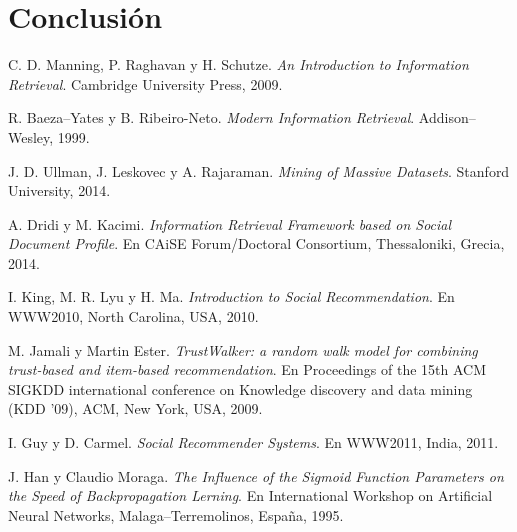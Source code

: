\documentclass[11pt, spanish]{report}
\begin{document}
	\chapter{Conclusión}
		
	
		
	\begin{thebibliography}{56}
		
  			C. D. Manning, P. Raghavan y H. Schutze.
  			\textit{An Introduction to Information Retrieval}.
  			Cambridge University Press, 
  			2009.
  		
  			R. Baeza--Yates y B. Ribeiro-Neto.
  			\textit{Modern Information Retrieval}.
  			Addison--Wesley, 
  			1999.
  		
  			J. D. Ullman, J. Leskovec y A. Rajaraman.
  			\textit{Mining of Massive Datasets}.
  			Stanford University, 
  			2014.
  			
  			A. Dridi y M. Kacimi. 
  			\textit{Information Retrieval Framework based on Social Document Profile}. 
  			En CAiSE Forum/Doctoral Consortium, Thessaloniki, Grecia, 2014.
  		
  			I. King, M. R. Lyu y H. Ma. 
  			\textit{Introduction to Social Recommendation}. 
  			En WWW2010, North Carolina, USA, 2010.

  			M. Jamali y Martin Ester. 
  			\textit{TrustWalker: a random walk model for combining trust-based and item-based recommendation}. 
  			En Proceedings of the 15th ACM SIGKDD international conference on Knowledge discovery and data mining (KDD '09), ACM, New York, USA, 2009.
  			
  			I. Guy y D. Carmel. 
  			\textit{Social Recommender Systems}. 
  			En WWW2011, India, 2011.
  			
  			J. Han y Claudio Moraga. 
  			\textit{The Influence of the Sigmoid Function Parameters on the Speed of Backpropagation Lerning}. 
  			En International Workshop on Artificial Neural Networks, Malaga--Terremolinos, España, 1995.
  		

\end{thebibliography}
\end{document}
